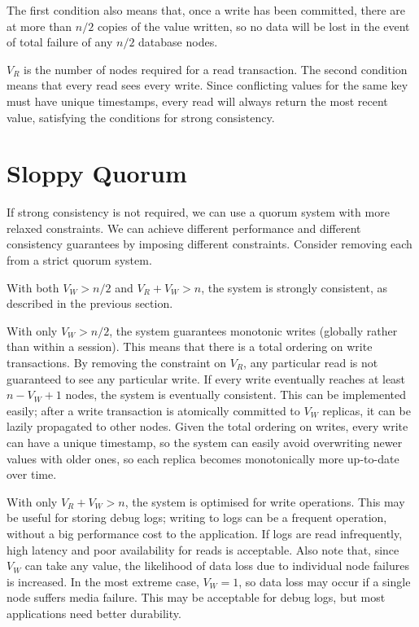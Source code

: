\documentclass[12pt,a4paper,twoside,openright]{report}
\begin{document}
The first condition also means that, once a write has been committed, there are at more than $n/2$ copies of the value written, so no data will be lost in the event of total failure of any $n/2$ database nodes.

$V_R$ is the number of nodes required for a read transaction. The second condition means that every read sees every write. Since conflicting values for the same key must have unique timestamps, every read will always return the most recent value, satisfying the conditions for strong consistency.

\section{Sloppy Quorum}

If strong consistency is not required, we can use a quorum system with more relaxed constraints. We can achieve different performance and different consistency guarantees by imposing different constraints. Consider removing each from a strict quorum system.

With both $V_W > n/2$ and $V_R + V_W > n$, the system is strongly consistent, as described in the previous section.

With only $V_W > n/2$, the system guarantees monotonic writes (globally rather than within a session). This means that there is a total ordering on write transactions. By removing the constraint on $V_R$, any particular read is not guaranteed to see any particular write. If every write eventually reaches at least $n - V_W + 1$ nodes, the system is eventually consistent. This can be implemented easily; after a write transaction is atomically committed to $V_W$ replicas, it can be lazily propagated to other nodes. Given the total ordering on writes, every write can have a unique timestamp, so the system can easily avoid overwriting newer values with older ones, so each replica becomes monotonically more up-to-date over time.

With only $V_R + V_W > n$, the system is optimised for write operations. This may be useful for storing debug logs; writing to logs can be a frequent operation, without a big performance cost to the application. If logs are read infrequently, high latency and poor availability for reads is acceptable. Also note that, since $V_W$ can take any value, the likelihood of data loss due to individual node failures is increased. In the most extreme case, $V_W = 1$, so data loss may occur if a single node suffers media failure. This may be acceptable for debug logs, but most applications need better durability.
\end{document}
